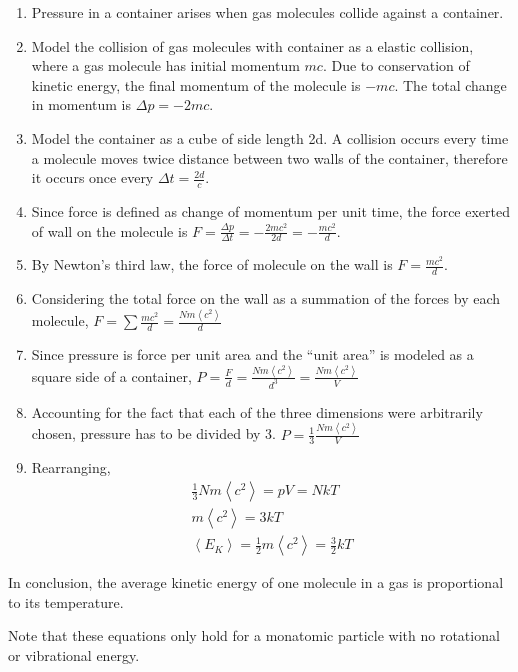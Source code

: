 \documentclass[../main]{subfiles}
\begin{document}
	\begin{enumerate}
		\item Pressure in a container arises when gas molecules collide against a container.
		\item Model the collision of gas molecules with container as a elastic collision, where a gas molecule has initial momentum \(mc\). Due to conservation of kinetic energy, the final momentum of the molecule is \(-mc\). The total change in momentum is \(\Delta p = -2mc\).
		\item Model the container as a cube of side length 2d. A collision occurs every time a molecule moves twice distance between two walls of the container, therefore it occurs once every \(\Delta t = \frac{2d}{c}\).
		\item Since force is defined as change of momentum per unit time, the force exerted of wall on the molecule is \(F = \frac{\Delta p}{\Delta t} = -\frac{2mc^2}{2d} = -\frac{mc^2}{d}\).
		\item By Newton's third law, the force of molecule on the wall is \(F = \frac{mc^2}{d}\).
		\item Considering the total force on the wall as a summation of the forces by each molecule, \(F = \sum \frac{mc^2}{d} = \frac{Nm\left<c^2\right>}{d}\)
		\item Since pressure is force per unit area and the ``unit area'' is modeled as a square side of a container, \(P = \frac{F}{d} = \frac{Nm\left<c^2\right>}{d^3} = \frac{Nm\left<c^2\right>}{V}\)
		\item Accounting for the fact that each of the three dimensions were arbitrarily chosen, pressure has to be divided by 3. \(P = \frac{1}{3}\frac{Nm\left<c^2\right>}{V}\)
		\item Rearranging,
		\begin{equation*} \begin{gathered}
			\frac{1}{3} Nm\left<c^2\right> = pV = NkT \\
			m\left<c^2\right> = 3kT \\
			\left<E_K\right> = \frac{1}{2} m\left<c^2\right> = \frac{3}{2} kT
		\end{gathered} \end{equation*}
	\end{enumerate}

	In conclusion, the average kinetic energy of one molecule in a gas is proportional to its temperature. \\



	Note that these equations only hold for a monatomic particle with no rotational or vibrational energy.
\end{document}
